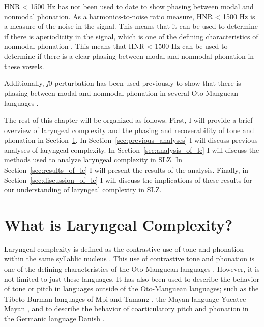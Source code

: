HNR < 1500 Hz has not been used to date to show phasing between modal and nonmodal phonation. As a harmonics-to-noise ratio measure, HNR < 1500 Hz is a measure of the noise in the signal. This means that it can be used to determine if there is aperiodicity in the signal, which is one of the defining characteristics of nonmodal phonation \citep{ladefogedSoundsWorldsLanguages1996}. This means that HNR < 1500 Hz can be used to determine if there is a clear phasing between modal and nonmodal phonation in these vowels. 

Additionally, \textit{f}0 perturbation has been used previously to show that there is phasing between modal and nonmodal phonation in several Oto-Manguean languages \citep{garellekAcousticConsequencesPhonation2011,dicanioCoarticulationToneGlottal2012,keltererPhonationTypeContrasts2020}. 

The rest of this chapter will be organized as follows. First, I will provide a brief overview of laryngeal complexity and the phasing and recoverability of tone and phonation in Section~\ref{sec:what_is_lc}. In Section~\ref{sec:previous_analyses} I will discuss previous analyses of laryngeal complexity. In Section~\ref{sec:analysis_of_lc} I will discuss the methods used to analyze laryngeal complexity in SLZ. In Section~\ref{sec:results_of_lc} I will present the results of the analysis. Finally, in Section~\ref{sec:discussion_of_lc} I will discuss the implications of these results for our understanding of laryngeal complexity in SLZ.

\section{What is Laryngeal Complexity?}\label{sec:what_is_lc}

Laryngeal complexity is defined as the contrastive use of tone and phonation within the same syllablic nucleus \citep{blankenshipTimeCourseBreathiness1997,blankenshipTimingNonmodalPhonation2002,silvermanLaryngealComplexityOtomanguean1997,silvermanPhasingRecoverability1997}. This use of contrastive tone and phonation is one of the defining characteristics of the Oto-Manguean languages \citep{silvermanLaryngealComplexityOtomanguean1997}. However, it is not limited to just these languages. It has also been used to describe the behavior of tone or pitch in languages outside of the Oto-Manguean languages; such as the Tibeto-Burman languages of Mpi and Tamang \citep{silvermanLaryngealComplexityOtomanguean1997,silvermanPhasingRecoverability1997}, the Mayan language Yucatec Mayan \citep{frazierPhoneticsYucatecMaya2013}, and to describe the behavior of coarticulatory pitch and phonation in the Germanic language Danish \citep{frazierPhoneticsYucatecMaya2013,penaStodTimingDomain2022,penaProductionPerceptionStod2024}.

